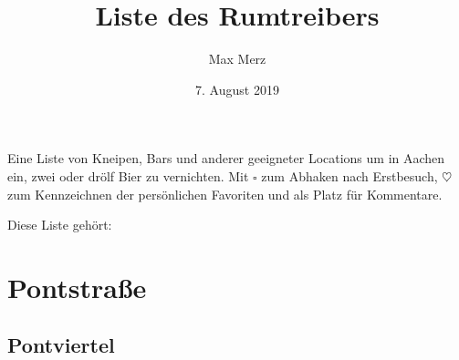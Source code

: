 \documentclass[8pt]{article}
\title{Liste des Rumtreibers}
\author{Max Merz}
\date{7. August 2019}
\begin{document}
\begin{titlepage}
	\centering
	{\strut\par}
	\vfill
	{\Large \makeatletter\@title\makeatother \par}
	\vspace{4em}
	{Eine Liste von  Kneipen, Bars und anderer geeigneter Locations um in Aachen ein, zwei oder drölf Bier zu vernichten.
	Mit $\square$ zum Abhaken nach Erstbesuch, $\heartsuit$ zum Kennzeichnen der persönlichen Favoriten und \underline{\hspace{3em}} als Platz für Kommentare.\par}
	\vfill
	\vfill
	{\footnotesize
		Diese Liste gehört: \underline{\hspace{20em}}
	\par}
\end{titlepage}

\newpage

\section{Pontstraße}
\label{sec:pontstrasse}

\begin{locations}
\end{locations}

\begin{locations}
\end{locations}

\begin{locations}
\end{locations}

\subsection{Pontviertel}
\label{sub:pontviertel}
\end{document}
